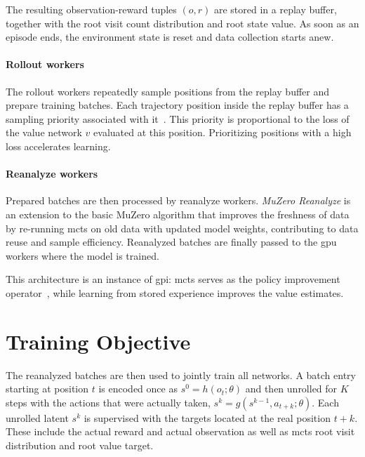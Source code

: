 The resulting observation-reward tuples $(o,r)$ are stored in a replay buffer,
together with the root visit count distribution and root state value.
As soon as an episode ends, the environment state is reset and data collection starts anew.

\paragraph{Rollout workers}

The rollout workers repeatedly sample positions from the replay buffer and
prepare training batches.
Each trajectory position inside the replay buffer has a sampling priority associated with it~\cite{schaul_prioritized_2016}.
This priority is proportional to the loss of the value network $v$ evaluated at this position.
Prioritizing positions with a high loss accelerates learning.

\paragraph{Reanalyze workers}

Prepared batches are then processed by reanalyze workers.
\emph{MuZero Reanalyze} is an extension to the basic MuZero algorithm that improves the freshness of
data by re-running \gls{mcts} on old data with updated model weights, contributing to data reuse and sample efficiency.
Reanalyzed batches are finally passed to the \gls{gpu} workers where the model is trained.

This architecture is an instance of \gls{gpi}:
\gls{mcts} serves as the policy improvement operator~\cite{grill_monte-carlo_2020}, while learning from stored experience
improves the value estimates.

\section{Training Objective}\label{sec:ez-loss}

The reanalyzed batches are then used to jointly train all networks.
A batch entry starting at position $t$ is encoded once as $s^0=h(o_t;\theta)$ and then
unrolled for $K$ steps with the actions that were actually taken,
$s^k=g(s^{k-1},a_{t+k};\theta)$.
Each unrolled latent $s^k$ is supervised with the targets located at the real
position $t+k$. These include the actual reward and actual observation as well
as \gls{mcts} root visit distribution and root value target.

